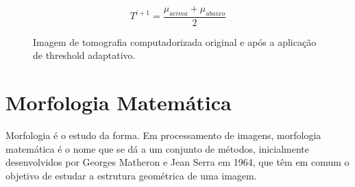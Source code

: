 \begin{equation}
 T^{i+1} = \frac{\mu_{acima}+\mu_{abaixo}}{2}
 \label{equa:thresholdAdaptativo}
\end{equation}

\begin{figure}[ht]
 \begin{center}
 \end{center}
 \caption{Imagem de tomografia computadorizada original e após a aplicação de threshold adaptativo.}
 \label{fig:threshold}
\end{figure}

\section{Morfologia Matemática}

Morfologia é o estudo da forma. Em processamento de imagens, morfologia matemática é o nome que se dá a um conjunto de métodos, inicialmente desenvolvidos por Georges Matheron e Jean Serra  em 1964, que têm em comum o objetivo de estudar a estrutura geométrica de uma imagem.

